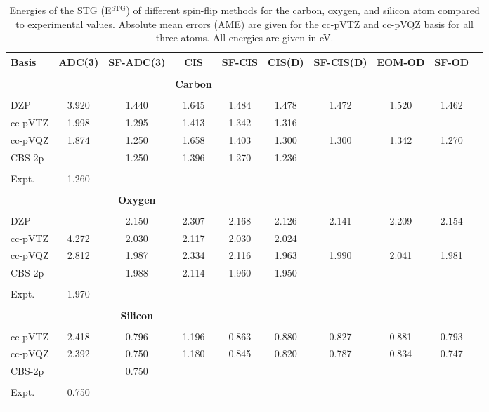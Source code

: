 \documentclass[aip,graphicx,amsmath,reprint]{revtex4-1}
\begin{document}
\begin{table}
\caption{\label{tab:atoms} Energies of the STG (E$^{{\text{STG}}}$) of different spin-flip methods for the carbon, oxygen, and silicon atom compared to experimental values. Absolute mean errors (AME) are given for the cc-pVTZ and cc-pVQZ basis for all three atoms. All energies are given in eV.}
\begin{ruledtabular}
\begin{tabular}{lccccccccc}
Basis & ADC(3) & SF-ADC(3) & CIS\footnotemark[2] &SF-CIS\footnotemark[2] &CIS(D)\footnotemark[2] &SF-CIS(D)\footnotemark[2] & EOM-OD\footnotemark[2] & SF-OD\footnotemark[2] \\
\hline
&&&&\\
&&&{\bf{Carbon}}&&\\
&&&&\\
DZP& 3.920&1.440 & 1.645 & 1.484 & 1.478 & 1.472 & 1.520 &1.462 \\ 
cc-pVTZ&1.998&   1.295 & 1.413 & 1.342 & 1.316&& \\ 
cc-pVQZ&1.874& 1.250 &1.658 & 1.403 & 1.300 &1.300 & 1.342 & 1.270 \\ 
CBS-2p&&1.250&1.396&1.270&1.236\\
&&&&\\
Expt.\footnotemark[1]&1.260&&&\\
&&&&\\

&&{\bf{Oxygen}}&&\\
&&&&\\
DZP&& 2.150  & 2.307 & 2.168 & 2.126 & 2.141& 2.209 & 2.154 \\ 
cc-pVTZ&4.272&  2.030 & 2.117 & 2.030 & 2.024 \\ 
cc-pVQZ&2.812& 1.987& 2.334  & 2.116 & 1.963 & 1.990 & 2.041 & 1.981 \\ 
CBS-2p&& 1.988 &2.114&1.960&1.950\\
&&&&\\
Expt.\footnotemark[1]&1.970&&&\\
&&&&\\

&&{\bf{Silicon}}&&\\
&&&&\\
cc-pVTZ&2.418&  0.796 & 1.196 & 0.863 & 0.880 & 0.827 & 0.881 & 0.793 \\ 
cc-pVQZ&2.392& 0.750 &  1.180 & 0.845 &  0.820 &0.787 & 0.834  &0.747 \\ 
CBS-2p&& 0.750 &&&\\
&&&&\\
Expt.\footnotemark[1]&0.750&&&\\
&&&&\\



\end{tabular}
\end{ruledtabular}
\end{table}
\end{document}
